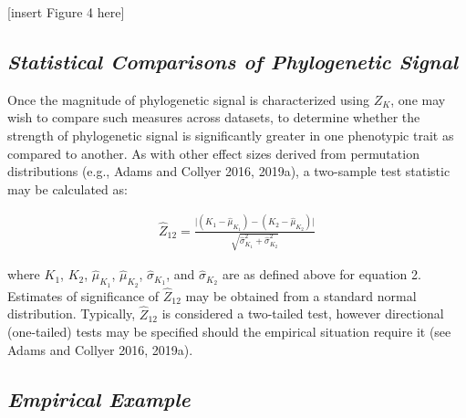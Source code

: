 \documentclass[
]{article}
\begin{document}
{[}insert Figure 4 here{]}

\hypertarget{statistical-comparisons-of-phylogenetic-signal}{%
\subsection{\texorpdfstring{\emph{Statistical Comparisons of
Phylogenetic
Signal}}{Statistical Comparisons of Phylogenetic Signal}}\label{statistical-comparisons-of-phylogenetic-signal}}

Once the magnitude of phylogenetic signal is characterized using
\(Z_K\), one may wish to compare such measures across datasets, to
determine whether the strength of phylogenetic signal is significantly
greater in one phenotypic trait as compared to another. As with other
effect sizes derived from permutation distributions (e.g., Adams and
Collyer 2016, 2019a), a two-sample test statistic may be calculated as:

\begin{align}
  \hat{Z}_{12}=\frac{\lvert{(K_{1}-\hat\mu_{K_1})-(K_{2}-\hat\mu_{K_2})}\rvert}{\sqrt{\hat\sigma^2_{K_1}+\hat\sigma^2_{K_2}}}
\end{align}

where \(K_1\), \(K_2\), \(\hat\mu_{K_1}\), \(\hat\mu_{K_2}\),
\(\hat\sigma_{K_1}\), and \(\hat\sigma_{K_2}\) are as defined above for
equation 2. Estimates of significance of \(\hat{Z}_{12}\) may be
obtained from a standard normal distribution. Typically,
\(\hat{Z}_{12}\) is considered a two-tailed test, however directional
(one-tailed) tests may be specified should the empirical situation
require it (see Adams and Collyer 2016, 2019a). \hfill\break

\hypertarget{empirical-example}{%
\subsection{\texorpdfstring{\emph{Empirical
Example}}{Empirical Example}}\label{empirical-example}}
\end{document}
